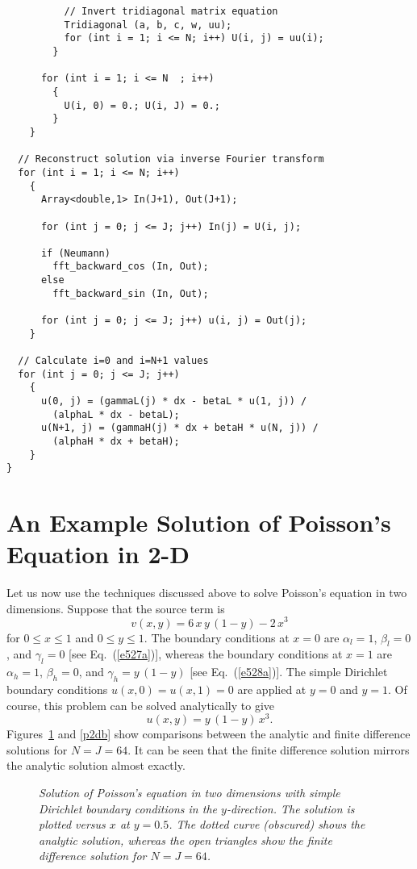{\begin{verbatim}
          // Invert tridiagonal matrix equation
          Tridiagonal (a, b, c, w, uu);
          for (int i = 1; i <= N; i++) U(i, j) = uu(i);
        }
      
      for (int i = 1; i <= N  ; i++) 
        {
          U(i, 0) = 0.; U(i, J) = 0.;
        }
    }

  // Reconstruct solution via inverse Fourier transform
  for (int i = 1; i <= N; i++)
    {
      Array<double,1> In(J+1), Out(J+1);

      for (int j = 0; j <= J; j++) In(j) = U(i, j);

      if (Neumann)
        fft_backward_cos (In, Out);
      else
        fft_backward_sin (In, Out);

      for (int j = 0; j <= J; j++) u(i, j) = Out(j);
    }

  // Calculate i=0 and i=N+1 values  
  for (int j = 0; j <= J; j++)
    {
      u(0, j) = (gammaL(j) * dx - betaL * u(1, j)) /
        (alphaL * dx - betaL);
      u(N+1, j) = (gammaH(j) * dx + betaH * u(N, j)) /
        (alphaH * dx + betaH);
    }
}
\end{verbatim}}

\section{An Example Solution of Poisson's Equation in 2-D}
Let us now use the techniques discussed above to solve Poisson's
equation in two dimensions. Suppose that the source term is
\begin{equation}
v(x,y) = 6\,x\,y\,(1-y) - 2\,x^3
\end{equation}
for $0\leq x \leq 1$ and $0\leq y \leq 1$. The boundary conditions
at $x=0$ are $\alpha_l=1$, $\beta_l=0$, and $\gamma_l=0$ [see Eq.~(\ref{e527a})], whereas
the boundary conditions at $x=1$ are $\alpha_h=1$, $\beta_h=0$,
and  $\gamma_h=y\,(1-y)$ [see Eq.~(\ref{e528a})]. The simple Dirichlet boundary
conditions $u(x,0)=u(x,1)=0$ are applied at $y=0$ and $y=1$. Of course,
this problem can be solved analytically to give
\begin{equation}
u(x,y) = y\,(1-y)\,x^3.
\end{equation}
Figures~\ref{p2da} and \ref{p2db} show comparisons between the analytic and finite difference
solutions for $N=J=64$. It can be seen that the finite difference solution mirrors
the analytic solution almost exactly.

\begin{figure}
\epsfysize=3in
\centerline{}
\caption{\em Solution of Poisson's equation in two dimensions  with simple
Dirichlet boundary conditions in the $y$-direction. The solution is plotted versus $x$ at
$y=0.5$.
The dotted curve (obscured)
shows the analytic solution, whereas the open triangles show the finite difference
solution for $N=J=64$.}\label{p2da}
\end{figure}

